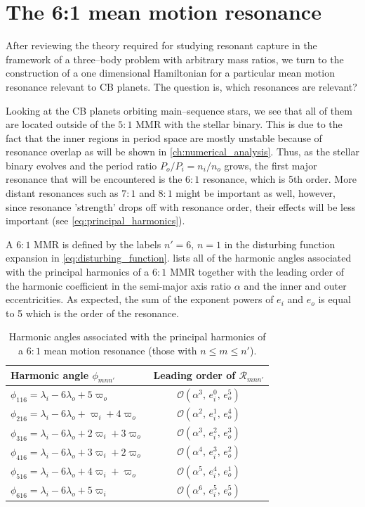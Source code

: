\documentclass[twoside,openright,titlepage,numbers=noenddot,headinclude,%
                footinclude=true,cleardoublepage=empty,abstractoff, 
                BCOR=5mm,paper=a4,fontsize=11pt,%
                american,%
                ]{scrreprt}%
\begin{document}
\section{The 6:1 mean motion resonance}
\label{sec:6_by_1_resonance}
After reviewing the theory required for studying
resonant capture in the framework of a three--body problem
with arbitrary mass ratios, we turn to the construction of
a one dimensional Hamiltonian for a particular mean motion 
resonance relevant to CB planets. The question is,
which resonances are relevant?

Looking at the CB planets orbiting main--sequence stars,
we see that all of them are located outside of the $5:1$ MMR
with the stellar binary. This is due to the fact that the inner
regions in period space are  mostly unstable because of resonance overlap
as will be shown in \cref{ch:numerical_analysis}. Thus, as the 
stellar binary evolves and the period ratio $P_o/P_i=n_i/n_o$ grows,
the first major resonance that will be encountered is the $6:1$ resonance,
which is 5th order.
More distant resonances such as $7:1$ and $8:1$ might be important
as well, however, since resonance 'strength' drops off with resonance
order, their effects will be less important (see \cref{eq:principal_harmonics}). 


A $6:1$ MMR is defined by the labels $n'=6,\,n=1$ in the disturbing
function expansion in \cref{eq:disturbing_function}. 
lists all of the harmonic angles associated with the principal
harmonics of a $6:1$ MMR together with the leading order of the
harmonic coefficient in the semi-major axis ratio $\alpha$ and
the inner and outer eccentricities. As expected, the sum of the
exponent powers of $e_i$ and $e_o$ is equal to 5 which is the order
of the resonance.
\begin{table}[h!]
\centering
\begin{tabular}{l c}
\toprule
    Harmonic angle $\phi_{mnn'}$ & Leading order of $\mathcal{R}_{mnn'}$\\
\midrule
    $\phi_{116}=\lambda_i-6\lambda_o+5\varpi_o$ & 
    $\mathcal{O}(\alpha^3,\,e_i^0,\,e_o^5)$\\
$\phi_{216}=\lambda_i-6\lambda_o+\varpi_i + 4\varpi_o$ & 
    $\mathcal{O}(\alpha^2,\,e_i^1,\,e_o^4)$\\
$\phi_{316}=\lambda_i-6\lambda_o+2\varpi_i + 3\varpi_o$ & 
    $\mathcal{O}(\alpha^3,\,e_i^2,\,e_o^3)$\\
$\phi_{416}=\lambda_i-6\lambda_o+3\varpi_i + 2\varpi_o$ & 
    $\mathcal{O}(\alpha^4,\,e_i^3,\,e_o^2)$\\
$\phi_{516}=\lambda_i-6\lambda_o+4\varpi_i + \varpi_o$ & 
    $\mathcal{O}(\alpha^5,\,e_i^4,\,e_o^1)$\\
$\phi_{616}=\lambda_i-6\lambda_o+5\varpi_i  $ & 
    $\mathcal{O}(\alpha^6,\,e_i^5,\,e_o^5)$\\
\bottomrule
\end{tabular}
    \caption[$6:1$ MMR harmonic angles.]{Harmonic angles 
    associated with the principal harmonics
    of a $6:1$ mean motion resonance (those with $n\leq m\leq n'$).}
\label{tab:6_1_angles}
\end{table}
\end{document}
